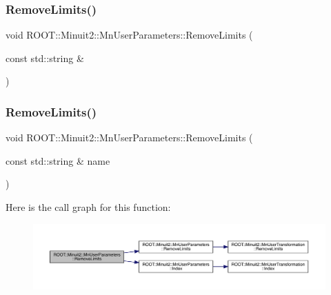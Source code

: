 \subsubsection{\texorpdfstring{RemoveLimits()}{RemoveLimits()}\hspace{0.1cm}{\footnotesize\ttfamily [3/4]}}
{\footnotesize\ttfamily void R\+O\+O\+T\+::\+Minuit2\+::\+Mn\+User\+Parameters\+::\+Remove\+Limits (\begin{DoxyParamCaption}\item[{const std\+::string \&}]{ }\end{DoxyParamCaption})}

\mbox{\label{classROOT_1_1Minuit2_1_1MnUserParameters_a4aff83aa7fb5e9c0a7edf70f360f68fa}} 
\subsubsection{\texorpdfstring{RemoveLimits()}{RemoveLimits()}\hspace{0.1cm}{\footnotesize\ttfamily [4/4]}}
{\footnotesize\ttfamily void R\+O\+O\+T\+::\+Minuit2\+::\+Mn\+User\+Parameters\+::\+Remove\+Limits (\begin{DoxyParamCaption}\item[{const std\+::string \&}]{name }\end{DoxyParamCaption})}

Here is the call graph for this function\+:\nopagebreak
\begin{figure}[H]
\begin{center}
\leavevmode
\includegraphics[width=350pt]{d6/d10/classROOT_1_1Minuit2_1_1MnUserParameters_a4aff83aa7fb5e9c0a7edf70f360f68fa_cgraph}
\end{center}
\end{figure}
\mbox{\label{classROOT_1_1Minuit2_1_1MnUserParameters_a64cbb6833d91d7f3bdef5b4dec9ae20f}} 
